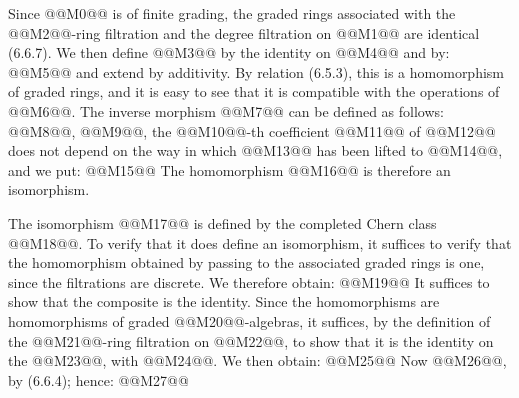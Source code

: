 Since @@M0@@ is of finite grading, the graded rings associated with the @@M2@@-ring filtration and the degree filtration on @@M1@@ are identical (6.6.7). We then define @@M3@@ by the identity on @@M4@@ and by:
@@M5@@
and extend by additivity. By relation (6.5.3), this is a homomorphism of graded rings, and it is easy to see that it is compatible with the operations of @@M6@@. The inverse morphism @@M7@@ can be defined as follows: @@M8@@, @@M9@@, the @@M10@@-th coefficient @@M11@@ of @@M12@@ does not depend on the way in which @@M13@@ has been lifted to @@M14@@, and we put:
@@M15@@
The homomorphism @@M16@@ is therefore an isomorphism.

The isomorphism @@M17@@ is defined by the completed Chern class @@M18@@. To verify that it does define an isomorphism, it suffices to verify that the homomorphism obtained by passing to the associated graded rings is one, since the filtrations are discrete. We therefore obtain:
@@M19@@
It suffices to show that the composite is the identity. Since the homomorphisms are homomorphisms of graded @@M20@@-algebras, it suffices, by the definition of the @@M21@@-ring filtration on @@M22@@, to show that it is the identity on the @@M23@@, with @@M24@@. We then obtain:
@@M25@@
Now @@M26@@, by (6.6.4); hence:
@@M27@@
